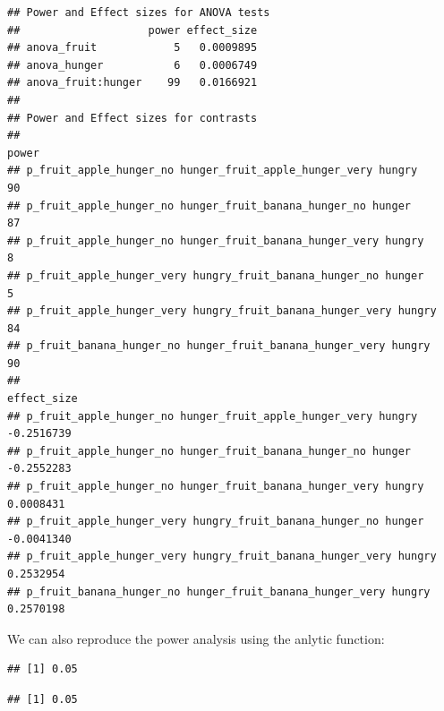 \documentclass[]{book}
\newenvironment{Shaded}{\begin{snugshade}}{\end{snugshade}}
\newcommand{\KeywordTok}[1]{\textcolor[rgb]{0.13,0.29,0.53}{\textbf{#1}}}
\newcommand{\NormalTok}[1]{#1}
\newcommand{\OperatorTok}[1]{\textcolor[rgb]{0.81,0.36,0.00}{\textbf{#1}}}
\newcommand{\StringTok}[1]{\textcolor[rgb]{0.31,0.60,0.02}{#1}}
\begin{document}
\begin{verbatim}
## Power and Effect sizes for ANOVA tests
##                    power effect_size
## anova_fruit            5   0.0009895
## anova_hunger           6   0.0006749
## anova_fruit:hunger    99   0.0166921
## 
## Power and Effect sizes for contrasts
##                                                                  power
## p_fruit_apple_hunger_no hunger_fruit_apple_hunger_very hungry       90
## p_fruit_apple_hunger_no hunger_fruit_banana_hunger_no hunger        87
## p_fruit_apple_hunger_no hunger_fruit_banana_hunger_very hungry       8
## p_fruit_apple_hunger_very hungry_fruit_banana_hunger_no hunger       5
## p_fruit_apple_hunger_very hungry_fruit_banana_hunger_very hungry    84
## p_fruit_banana_hunger_no hunger_fruit_banana_hunger_very hungry     90
##                                                                  effect_size
## p_fruit_apple_hunger_no hunger_fruit_apple_hunger_very hungry     -0.2516739
## p_fruit_apple_hunger_no hunger_fruit_banana_hunger_no hunger      -0.2552283
## p_fruit_apple_hunger_no hunger_fruit_banana_hunger_very hungry     0.0008431
## p_fruit_apple_hunger_very hungry_fruit_banana_hunger_no hunger    -0.0041340
## p_fruit_apple_hunger_very hungry_fruit_banana_hunger_very hungry   0.2532954
## p_fruit_banana_hunger_no hunger_fruit_banana_hunger_very hungry    0.2570198
\end{verbatim}

We can also reproduce the power analysis using the anlytic function:

\begin{Shaded}
\end{Shaded}

\begin{verbatim}
## [1] 0.05
\end{verbatim}

\begin{Shaded}
\end{Shaded}

\begin{verbatim}
## [1] 0.05
\end{verbatim}
\end{document}
